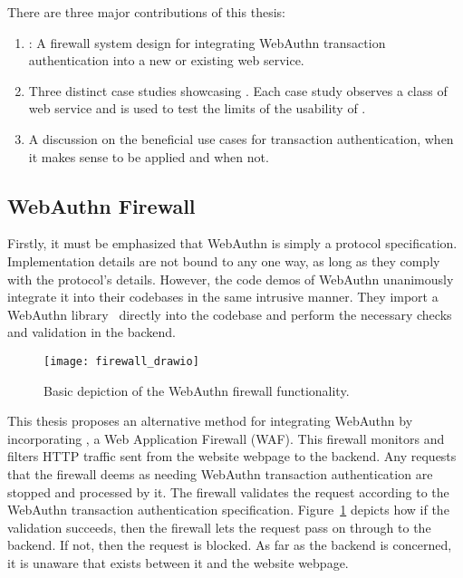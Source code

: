 There are three major contributions of this thesis:

\begin{enumerate}[nosep]

\item \sys{}: A firewall system design for integrating WebAuthn transaction authentication into a new or existing web service.

\item Three distinct case studies showcasing \sys{}. Each case study observes a class of web service and is used to test the limits of the usability of \sys{}.

\item A discussion on the beneficial use cases for transaction authentication, when it makes sense to be applied and when not.

\end{enumerate}


\subsection{WebAuthn Firewall}

Firstly, it must be emphasized that WebAuthn is simply a protocol specification. Implementation details are not bound to any one way, as long as they comply with the protocol's details. However, the code demos of WebAuthn unanimously integrate it into their codebases in the same intrusive manner. They import a WebAuthn library~\cite{webauthn-library} directly into the codebase and perform the necessary checks and validation in the backend.

\begin{figure}[h]
  \centering
  \texttt{[image: firewall\_drawio]}
  \caption{Basic depiction of the WebAuthn firewall functionality.}
  \label{Fig:BasicFirewallDepiction}
\end{figure}

This thesis proposes an alternative method for integrating WebAuthn by incorporating \sys{}, a Web Application Firewall (WAF). This firewall monitors and filters HTTP traffic sent from the website webpage to the backend. Any requests that the firewall deems as needing WebAuthn transaction authentication are stopped and processed by it. The firewall validates the request according to the WebAuthn transaction authentication specification. Figure~\ref{Fig:BasicFirewallDepiction} depicts how if the validation succeeds, then the firewall lets the request pass on through to the backend. If not, then the request is blocked. As far as the backend is concerned, it is unaware that \sys{} exists between it and the website webpage. 


